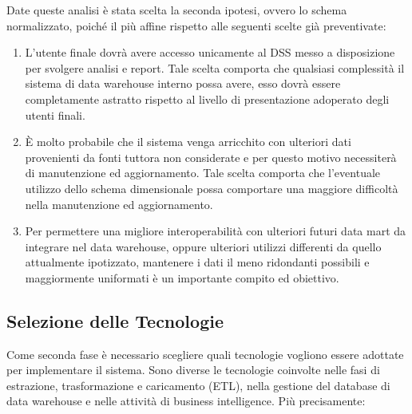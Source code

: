 Date queste analisi è stata scelta la seconda ipotesi, ovvero lo schema normalizzato, poiché il più affine rispetto alle seguenti scelte già preventivate:

\begin{enumerate}
    \item L'utente finale dovrà avere accesso unicamente al DSS messo a disposizione per svolgere analisi e report. Tale scelta comporta che qualsiasi complessità il sistema di data warehouse interno possa avere, esso dovrà essere completamente astratto rispetto al livello di presentazione adoperato degli utenti finali.
    \item È molto probabile che il sistema venga arricchito con ulteriori dati provenienti da fonti tuttora non considerate e per questo motivo necessiterà di manutenzione ed aggiornamento. Tale scelta comporta che l'eventuale utilizzo dello schema dimensionale possa comportare una maggiore difficoltà nella manutenzione ed aggiornamento.
    \item Per permettere una migliore interoperabilità con ulteriori futuri data mart da integrare nel data warehouse, oppure ulteriori utilizzi differenti da quello attualmente ipotizzato, mantenere i dati il meno ridondanti possibili e maggiormente uniformati è un importante compito ed obiettivo.
\end{enumerate}

\subsection{Selezione delle Tecnologie}

Come seconda fase è necessario scegliere quali tecnologie vogliono essere adottate per implementare il sistema. Sono diverse le tecnologie coinvolte nelle fasi di estrazione, trasformazione e caricamento (ETL), nella gestione del database di data warehouse e nelle attività di business intelligence. Più precisamente:

